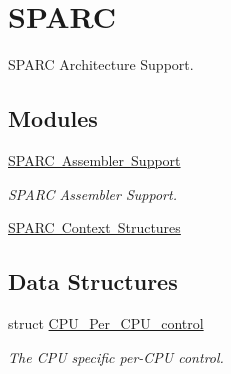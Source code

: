\hypertarget{group__RTEMSScoreCPUSPARC}{}\section{S\+P\+A\+RC}
\label{group__RTEMSScoreCPUSPARC}


S\+P\+A\+RC Architecture Support.  


\subsection*{Modules}
\begin{DoxyCompactItemize}
\item 
\mbox{\hyperlink{group__RTEMSScoreCPUSPARCASM}{S\+P\+A\+R\+C Assembler Support}}
\begin{DoxyCompactList}\small\item\em S\+P\+A\+RC Assembler Support. \end{DoxyCompactList}\item 
\mbox{\hyperlink{group__RTEMSScoreCPUSPARCContext}{S\+P\+A\+R\+C Context Structures}}
\end{DoxyCompactItemize}
\subsection*{Data Structures}
\begin{DoxyCompactItemize}
\item 
struct \mbox{\hyperlink{structCPU__Per__CPU__control}{C\+P\+U\+\_\+\+Per\+\_\+\+C\+P\+U\+\_\+control}}
\begin{DoxyCompactList}\small\item\em The C\+PU specific per-\/\+C\+PU control. \end{DoxyCompactList}\end{DoxyCompactItemize}
